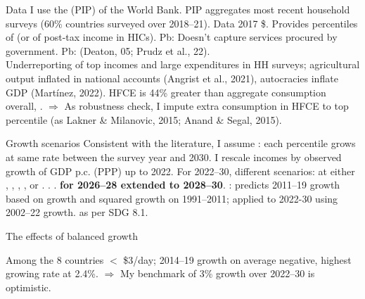 \documentclass[aspectratio=169,xcolor=dvipsnames, 11pt,mathserif]{beamer}
\begin{document}
\begin{frame}{Data}
    \bbsp
    \ip I use the  (PIP) of the World Bank. 
    \ip PIP aggregates most recent household surveys (60\% countries surveyed over 2018--21).
    \ip Data  2017 \$.
    \ip Provides percentiles of  (or of post-tax income in HICs).
    \ip Pb: Doesn't capture services procured by government.
    \ip Pb:  (Deaton, 05; Prudz et al., 22). \\ Underreporting of top incomes and large expenditures in HH surveys; agricultural output inflated in national accounts (Angrist et al., 2021), autocracies inflate GDP (Martínez, 2022).
    \ip HFCE is 44\% greater than aggregate consumption overall, .
    \ip $\Rightarrow$ As robustness check, I impute extra consumption in HFCE to top percentile (as Lakner \& Milanovic, 2015; Anand \& Segal, 2015).
    \ee
\end{frame}

\begin{frame}{Growth scenarios}
    \bbsp
    \ip Consistent with the literature, I assume : each percentile grows at same rate between the survey year and 2030. 
    \ip I rescale incomes by observed growth of GDP p.c. (PPP) up to 2022. For 2022--30, different scenarios: %
    \bbsp
    \ip \textbf{} at either \textbf{}, \textbf{} , \textbf{}, \textbf{}, or \textbf{}.%
    \ip \textbf{}.
    \ip \textbf{}.
    \ip \textbf{ for 2026--28 extended to 2028--30}.
    \ip \textbf{}: predicts 2011--19 growth based on growth and squared growth on 1991--2011; applied to 2022-30 using 2002--22 growth.
    \ip \textbf{} as per SDG 8.1.
    \ee \ee
\end{frame}

\begin{frame}{The effects of balanced growth}
    
    \pause
    Among the 8 countries $<$ \$3/day; 2014--19 growth on average negative, highest growing rate at 2.4\%.
    $\Rightarrow$ My benchmark of 3\% growth over 2022--30 is optimistic.
\end{frame}
\end{document}
